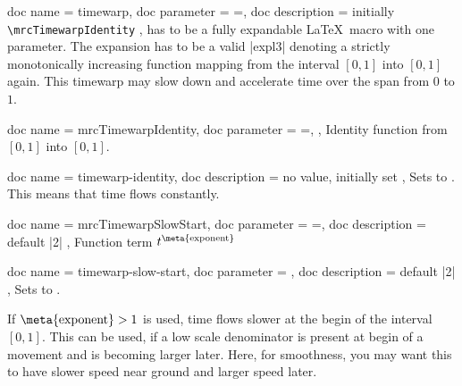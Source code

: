 \clearpage
\begin{docMrcKeys}[
    doc keypath = anim,
    doc new     = 2024-07-31,
  ]{
    {
      doc name        = timewarp,
      doc parameter   = {=},
      doc description = initially \texttt{\textbackslash mrcTimewarpIdentity}
    },
  }
   has to be a fully expandable \LaTeX\ macro with one parameter.
  The expansion has to be a valid |expl3| 
  denoting a strictly monotonically increasing function mapping from
  the interval \mbox{$[0,1]$} into \mbox{$[0,1]$} again.
  This timewarp may slow down and accelerate time over the span from $0$ to $1$.
\end{docMrcKeys}


\begin{docCommands}[
    doc new     = 2024-07-31,
  ]{
    {
      doc name        = mrcTimewarpIdentity,
      doc parameter   = {=},
    },
  }
  Identity function from \mbox{$[0,1]$} into \mbox{$[0,1]$}.
\end{docCommands}


\begin{docMrcKeys}[
    doc keypath = anim,
    doc new     = 2024-07-31,
  ]{
    {
      doc name        = timewarp-identity,
      doc description = {no value, initially set}
    },
  }
  Sets  to .
  This means that time flows constantly.
\end{docMrcKeys}


\begin{docCommands}[
    doc new     = 2024-07-31,
  ]{
    {
      doc name        = mrcTimewarpSlowStart,
      doc parameter   = {=},
      doc description = {default |2|}
    },
  }
  Function term $t^{\text{\meta{exponent}}}$
\end{docCommands}


\begin{docMrcKeys}[
    doc keypath = anim,
    doc new     = 2024-07-31,
  ]{
    {
      doc name        = timewarp-slow-start,
      doc parameter   = ,
      doc description = {default |2|}
    },
  }
  Sets  to .
  \par
  If $\text{\meta{exponent}}>1$ is used, time flows slower at the begin of the
  interval \mbox{$[0,1]$}. This can be used, if a low scale denominator is
  present at begin of a movement and is becoming larger later. Here, for smoothness,
  you may want this to have slower speed near ground and larger speed later.
\end{docMrcKeys}


